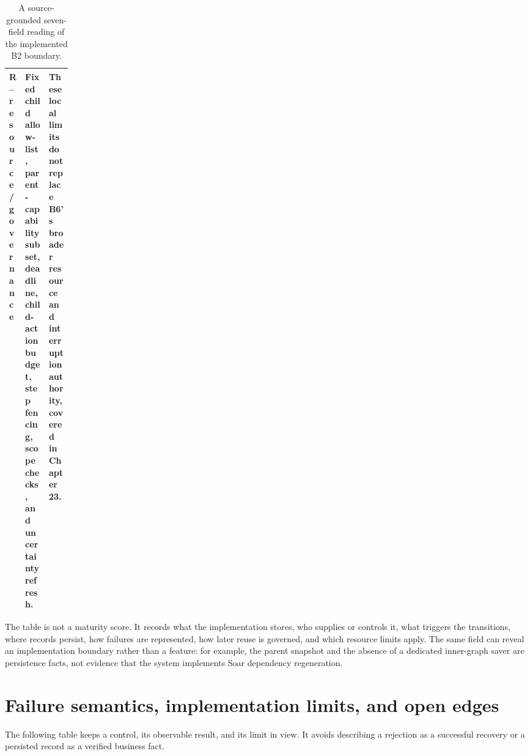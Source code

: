 \begin{table}[htbp]
\begin{tabularx}{\linewidth}{>{\raggedright\arraybackslash}p{0.12\linewidth}XX}
\textbf{R} -- resource/governance & Fixed child allow-list, parent-capability subset, deadline, child-action budget, step fencing, scope checks, and uncertainty refresh. & These local limits do not replace B6's broader resource and interruption authority, covered in Chapter 23. \\
\bottomrule
\end{tabularx}
\caption{A source-grounded seven-field reading of the implemented B2 boundary.}
\label{tab:ch22-seven-fields}
\end{table}

The table is not a maturity score. It records what the implementation stores, who supplies or controls it, what triggers the transitions, where records persist, how failures are represented, how later reuse is governed, and which resource limits apply. The same field can reveal an implementation boundary rather than a feature: for example, the parent snapshot and the absence of a dedicated inner-graph saver are persistence facts, not evidence that the system implements Soar dependency regeneration.

\section{Failure semantics, implementation limits, and open edges}
\label{sec:ch22-failures-limits}

The following table keeps a control, its observable result, and its limit in view. It avoids describing a rejection as a successful recovery or a persisted record as a verified business fact.

